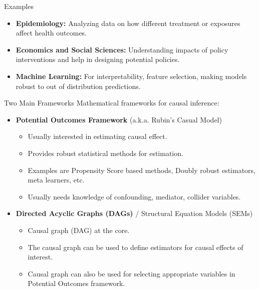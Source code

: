 \documentclass[aspectratio=169]{beamer}
\begin{document}
\begin{frame}{Examples}
	\begin{itemize}
		\item \textbf{Epidemiology:} Analyzing data on how different treatment or exposures affect health outcomes.
		\item \textbf{Economics and Social Sciences:} Understanding impacts of policy interventions and help in designing potential policies.
		\item \textbf{Machine Learning:} For interpretability, feature selection, making models robust to out of distribution predictions.
	\end{itemize}
\end{frame}

\begin{frame}{Two Main Frameworks}
	Mathematical frameworks for causal inference:
	\vspace{0.5em}
	\begin{itemize}
		\item \textbf{Potential Outcomes Framework} (a.k.a. Rubin's Casual Model)
			\begin{itemize}
				\item Usually interested in estimating causal effect.
				\item Provides robust statistical methods for estimation.
				\item Examples are Propensity Score based methods, Doubly robust estimators, meta learners, etc.
				\item Usually needs knowledge of confounding, mediator, collider variables.
			\end{itemize}
	\end{itemize}
	\vspace{1em}
	\begin{itemize}
		\item \textbf{Directed Acyclic Graphs (DAGs)} / Structural Equation Models (SEMs)
			\begin{itemize}
				\item Causal graph (DAG) at the core.
				\item The causal graph can be used to define estimators for causal effects of interest.
				\item Causal graph can also be used for selecting appropriate variables in Potential Outcomes framework.
			\end{itemize}
	\end{itemize}
\end{frame}
\end{document}
